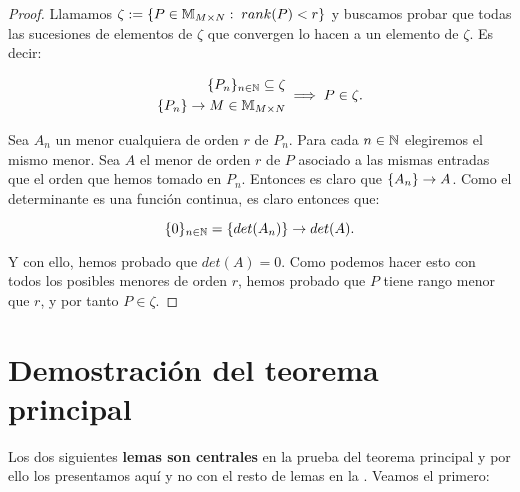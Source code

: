 \begin{proof}
    Llamamos $\zeta := \{ P \in \mathbb{M}_{M \times N}: \; rank(P) < r \}$ y buscamos probar que todas las sucesiones de elementos de $\zeta$ que convergen lo hacen a un elemento de $\zeta$. Es decir:

    \begin{equation}
        \begin{split}
            \{ P_n \}_{n \in \mathbb{N}} \subseteq \zeta \\
            \{ P_n \} \to M \in \mathbb{M}_{M \times N} \\
        \end{split}
        \implies P \in \zeta.
    \end{equation}

    Sea $A_n$ un menor cualquiera de orden $r$ de $P_n$. Para cada $n \in \mathbb{N}$ elegiremos el mismo menor. Sea $A$ el menor de orden $r$ de $P$ asociado a las mismas entradas que el orden que hemos tomado en $P_n$. Entonces es claro que $\{ A_n \} \to A$. Como el determinante es una función continua, es claro entonces que:

    \begin{equation}
        \{ 0 \}_{n \in \mathbb{N}} = \{ det(A_n) \} \to det(A).
    \end{equation}

    Y con ello, hemos probado que $det(A) = 0$. Como podemos hacer esto con todos los posibles menores de orden $r$, hemos probado que $P$ tiene rango menor que $r$, y por tanto $P \in \zeta$.
\end{proof}

\section{Demostración del teorema principal}

Los dos siguientes \textbf{lemas son centrales} en la prueba del teorema principal y por ello los presentamos aquí y no con el resto de lemas en la  . Veamos el primero:

